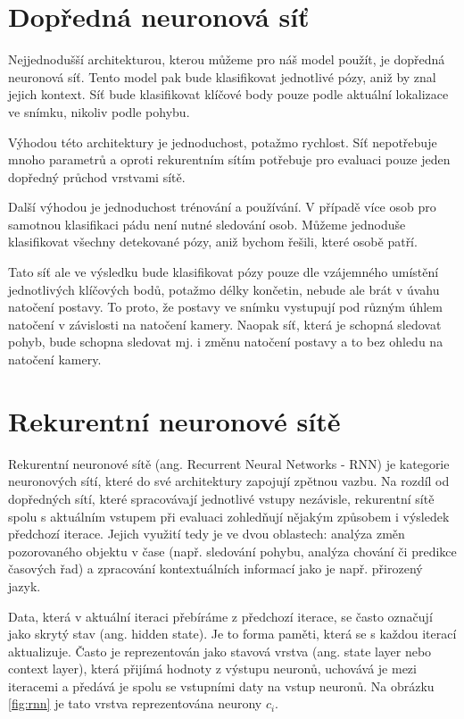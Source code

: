 \section{Dopředná neuronová síť}
Nejjednodušší architekturou, kterou můžeme pro náš model použít, je dopředná
neuronová síť. Tento model pak bude klasifikovat jednotlivé pózy, aniž by znal
jejich kontext. Síť bude klasifikovat klíčové body pouze podle aktuální
lokalizace ve snímku, nikoliv podle pohybu.

Výhodou této architektury je jednoduchost, potažmo rychlost. Síť nepotřebuje
mnoho parametrů a oproti rekurentním sítím potřebuje pro evaluaci pouze jeden
dopředný průchod vrstvami sítě.

Další výhodou je jednoduchost trénování a používání. V případě více osob pro
samotnou klasifikaci pádu není nutné sledování osob. Můžeme jednoduše
klasifikovat všechny detekované pózy, aniž bychom řešili, které osobě patří.

Tato síť ale ve výsledku bude klasifikovat pózy pouze dle vzájemného umístění
jednotlivých klíčových bodů, potažmo délky končetin, nebude ale brát v úvahu
natočení postavy. To proto, že postavy ve snímku vystupují pod různým úhlem
natočení v závislosti na natočení kamery. Naopak síť, která je schopná sledovat
pohyb, bude schopna sledovat mj. i změnu natočení postavy a to bez ohledu na
natočení kamery.

\section{Rekurentní neuronové sítě}

Rekurentní neuronové sítě (ang. Recurrent Neural Networks - RNN) je kategorie
neuronových sítí, které do své architektury zapojují zpětnou vazbu. Na rozdíl
od dopředných sítí, které spracovávají jednotlivé vstupy nezávisle, rekurentní
sítě spolu s aktuálním vstupem při evaluaci zohledňují nějakým způsobem i
výsledek předchozí iterace. Jejich využití tedy je ve dvou oblastech: analýza
změn pozorovaného objektu v čase (např. sledování pohybu, analýza chování či
predikce časových řad) a zpracování kontextuálních informací jako je např.
přirozený jazyk.

Data, která v aktuální iteraci přebíráme z předchozí iterace, se často označují
jako skrytý stav (ang. hidden state). Je to forma paměti, která se s každou
iterací aktualizuje. Často je reprezentován jako stavová vrstva (ang. state
layer nebo context layer), která přijímá hodnoty z výstupu neuronů, uchovává je
mezi iteracemi a předává je spolu se vstupními daty na vstup neuronů. Na
obrázku \ref{fig:rnn} je tato vrstva reprezentována neurony $c_i$.

